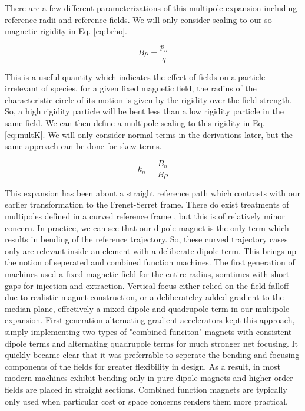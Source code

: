 There are a few different parameterizations of this multipole expansion including reference radii and reference fields. We will only consider scaling to our so magnetic rigidity in Eq. \ref{eq:brho}. 

\begin{equation} \label{eq:brho}
	B\rho = \frac{p_o}{q}
\end{equation}

This is a useful quantity which indicates the effect of fields on a particle irrelevant of species. for a given fixed magnetic field, the radius of the characteristic circle of its motion is given by the rigidity over the field strength. So, a high rigidity particle will be bent less than a low rigidity particle in the same field. We can then define a multipole scaling to this rigidity in Eq. \ref{eq:multK}. We will only consider normal terms in the derivations later, but the same approach can be done for skew terms.

\begin{equation} \label{eq:multK}
	k_n = \frac{B_n}{B\rho}
\end{equation}

This expansion has been about a straight reference path which contrasts with our earlier transformation to the Frenet-Serret frame. There do exist treatments of multipoles defined in a curved reference frame \cite{ZolkinMultipole}, but this is of relatively minor concern. In practice, we can see that our dipole magnet is the only term which results in bending of the reference trajectory. So, these curved trajectory cases only are relevant inside an element with a deliberate dipole term. This brings up the notion of seperated and combined function machines. The first generation of machines used a fixed magnetic field for the entire radius, somtimes with short gaps for injection and extraction. Vertical focus either relied on the field falloff due to realistic magnet construction, or a deliberateley added gradient to the median plane, effectively a mixed dipole and quadrupole term in our multipole expansion. First generation alternating gradient accelerators kept this approach, simply implementing two types of "combined funciton" magnets with consistent dipole terms and alternating quadrupole terms for much stronger net focusing. It quickly became clear that it was preferrable to seperate the bending and focusing components of the fields for greater flexibility in design. As a result, in most modern machines exhibit bending only in pure dipole magnets and higher order fields are placed in straight sections. Combined function magnets are typically only used when particular cost or space concerns renders them more practical.

